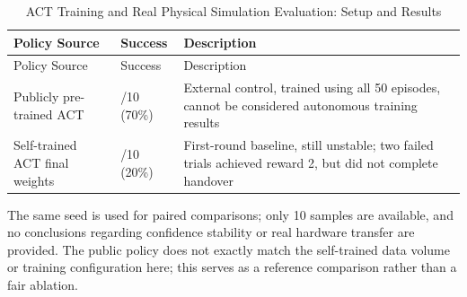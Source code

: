 \FloatBarrier\begingroup\small\setlength{\tabcolsep}{2.5pt}
\begin{longtable}[]{@{}
  >{\raggedright\arraybackslash}p{}
  >{\raggedleft\arraybackslash}p{}
  >{\raggedright\arraybackslash}p{}@{}}
\caption{ACT Training and Real Physical Simulation Evaluation: Setup and Results}\label{tab:s03-3}\tabularnewline
\toprule\noalign{}
\begin{minipage}[b]{\linewidth}\raggedright
Policy Source
\end{minipage} & \begin{minipage}[b]{\linewidth}\raggedleft
Success
\end{minipage} & \begin{minipage}[b]{\linewidth}\raggedright
Description
\end{minipage} \\
\midrule\noalign{}
\endfirsthead
\toprule\noalign{}
\begin{minipage}[b]{\linewidth}\raggedright
Policy Source
\end{minipage} & \begin{minipage}[b]{\linewidth}\raggedleft
Success
\end{minipage} & \begin{minipage}[b]{\linewidth}\raggedright
Description
\end{minipage} \\
\midrule\noalign{}
\endhead
\bottomrule\noalign{}
\endlastfoot
Publicly pre-trained ACT & 7/10 (70\%) & External control, trained using all 50 episodes, cannot be considered autonomous training results \\
Self-trained ACT final weights & 2/10 (20\%) & First-round baseline, still unstable; two failed trials achieved reward 2, but did not complete handover \\
\end{longtable}\endgroup

The same seed is used for paired comparisons; only 10 samples are available, and no conclusions regarding confidence stability or real hardware transfer are provided. The public policy does not exactly match the self-trained data volume or training configuration here; this serves as a reference comparison rather than a fair ablation.


